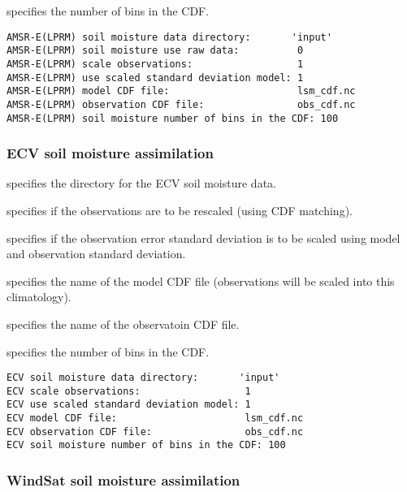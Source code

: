  specifies the number of bins in the CDF.
 

 \begin{Verbatim}[frame=single]
AMSR-E(LPRM) soil moisture data directory:       'input'
AMSR-E(LPRM) soil moisture use raw data:          0 
AMSR-E(LPRM) scale observations:                  1
AMSR-E(LPRM) use scaled standard deviation model: 1
AMSR-E(LPRM) model CDF file:                      lsm_cdf.nc
AMSR-E(LPRM) observation CDF file:                obs_cdf.nc
AMSR-E(LPRM) soil moisture number of bins in the CDF: 100 
 \end{Verbatim}

 
 \subsubsection{ECV soil moisture assimilation}
 \label{sssec:ecvsmda}
 

 
  specifies the directory
 for the ECV soil moisture data.

  specifies if the
 observations are to be rescaled (using CDF matching).

  specifies if
 the observation error standard deviation is to be scaled using
 model and observation standard deviation.

  specifies the
 name of the model CDF file (observations will be scaled into this
 climatology).

  specifies the
 name of the observatoin CDF file.

  specifies the
 number of bins in the CDF.
 

 \begin{Verbatim}[frame=single]
ECV soil moisture data directory:       'input'
ECV scale observations:                  1
ECV use scaled standard deviation model: 1
ECV model CDF file:                      lsm_cdf.nc
ECV observation CDF file:                obs_cdf.nc
ECV soil moisture number of bins in the CDF: 100 
 \end{Verbatim}

 
 \subsubsection{WindSat soil moisture assimilation}
 \label{sssec:windsatsmda}
 

